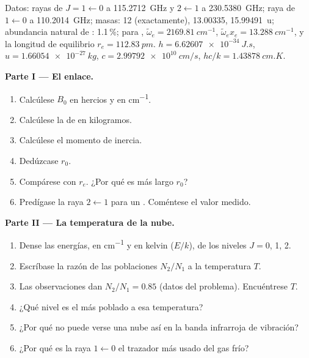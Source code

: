 \begin{problem}
\label{pb:b3:rovibrational-spectroscopy:1}
Datos: rayas de  $J = 1 \leftarrow 0$ a \qty{115.2712}{GHz} y $2
\leftarrow 1$ a \qty{230.5380}{GHz}; raya de  $1 \leftarrow 0$ a
\qty{110.2014}{GHz}; masas:  12 (exactamente),  13.00335,
 \qty{15.99491}{u}; abundancia natural de : 1.1\,\%; para ,
$\tilde\omega_e = \qty{2169.81}{cm^{-1}}$, $\tilde\omega_ex_e = \qty{13.288}{cm^{-1}}$, y la
longitud de equilibrio $r_e = \qty{112.83}{pm}$. $h = \qty{6.62607e-34}{J.s}$, $u =
\qty{1.66054e-27}{kg}$, $c = \qty{2.99792e10}{cm/s}$, $hc/k = \qty{1.43878}{cm.K}$.

\medskip\noindent\textbf{Parte I --- El enlace.}
\begin{enumerate}
  \item Calcúlese $B_0$ en hercios y en \unit{cm^{-1}}.
  \item Calcúlese la  de  en kilogramos.
  \item Calcúlese el momento de inercia.
  \item Dedúzcase $r_0$.
  \item Compárese con $r_e$. ¿Por qué es más largo $r_0$?
  \item Predígase la raya $2 \leftarrow 1$ para un . Coméntese el
        valor medido.
\end{enumerate}

\medskip\noindent\textbf{Parte II --- La temperatura de la nube.}
\begin{enumerate}[resume]
  \item Dense las energías, en \unit{cm^{-1}} y en kelvin ($E/k$), de los niveles $J =
        0$, 1, 2.
  \item Escríbase la razón de las poblaciones $N_2/N_1$ a la temperatura $T$.
  \item Las observaciones dan $N_2/N_1 = 0.85$ (datos del problema). Encuéntrese $T$.
  \item ¿Qué nivel es el más poblado a esa temperatura?
  \item ¿Por qué no puede verse una nube así en la banda infrarroja de vibración?
  \item ¿Por qué es la raya $1 \leftarrow 0$ el trazador más usado del gas frío?
\end{enumerate}


\end{problem}
